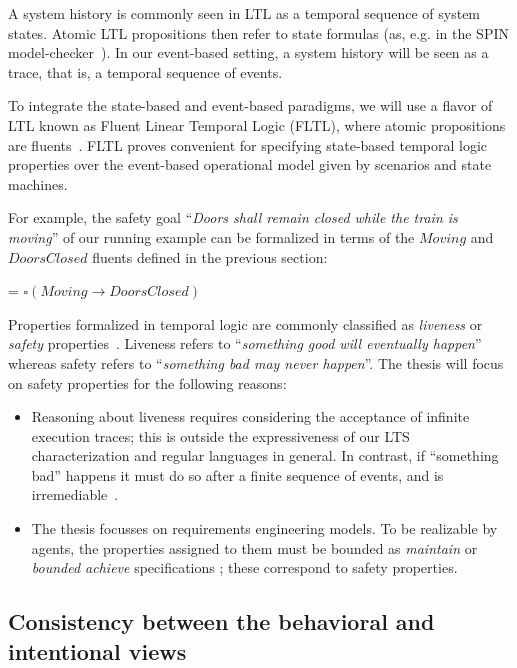 A system history is commonly seen in LTL as a temporal sequence of system states. Atomic LTL propositions then refer to state formulas (as, e.g. in the SPIN model-checker~\cite{Holzmann:1997}). In our event-based setting, a system history will be seen as a trace, that is, a temporal sequence of events. 

To integrate the state-based and event-based paradigms, we will use a flavor of LTL known as Fluent Linear Temporal Logic (FLTL), where atomic propositions are fluents~\cite{Giannakopoulou:2003}. FLTL proves convenient for specifying state-based temporal logic properties over the event-based operational model given by scenarios and state machines. 

For example, the safety goal ``\emph{Doors shall remain closed while the train is moving}'' of our running example can be formalized in terms of the $Moving$ and $DoorsClosed$ fluents defined in the previous section:
\begin{center}
 = $\square(Moving \rightarrow DoorsClosed)$
\end{center}

Properties formalized in temporal logic are commonly classified as \emph{liveness} or \emph{safety} properties~\cite{Alpern:1986, Lamport:1994}. Liveness refers to ``\emph{something good will eventually happen}'' whereas safety refers to  ``\emph{something bad may never happen}''. The thesis will focus on safety properties for the following reasons:
\begin{itemize}
\item Reasoning about liveness requires considering the acceptance of infinite execution traces; this is outside the expressiveness of our LTS characterization and regular languages in general. In contrast, if ``something bad'' happens it must do so after a finite sequence of events, and is irremediable~\cite{Alpern:1986, Giannakopoulou:1999}.
\item The thesis focusses on requirements engineering models. To be realizable by agents, the properties assigned to them must be bounded as \emph{maintain} or \emph{bounded achieve} specifications \cite{Letier:2002}; these correspond to safety properties.  
\end{itemize}

\subsection{Consistency between the behavioral and intentional views\label{subsection:background-goals-consistency}}

